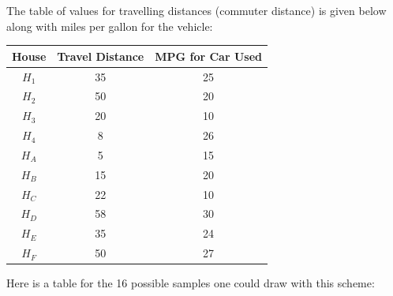 \documentclass[12pt]{article}
\begin{document}
The table of values for travelling distances (commuter distance) is given below along with miles per gallon for the vehicle:

\begin{center}
\begin{tabular}{ccc}
\toprule
House & Travel Distance & MPG for Car Used \\
\midrule
$H_1$ & 35 & 25 \\
$H_2$ & 50 & 20 \\
$H_3$ & 20 & 10 \\
$H_4$ & 8 & 26 \\
$H_A$ & 5 & 15 \\
$H_B$ & 15 & 20 \\
$H_C$ & 22 & 10 \\
$H_D$ & 58 & 30 \\
$H_E$ & 35 & 24 \\
$H_F$ & 50 & 27 \\
\bottomrule
\end{tabular}
\end{center}

Here is a table for the 16 possible samples one could draw with this scheme:
\end{document}
